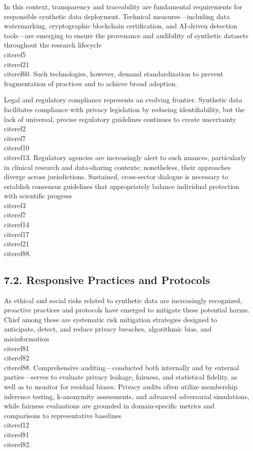\documentclass[11pt]{article}
\begin{document}
In this context, transparency and traceability are fundamental requirements for responsible synthetic data deployment. Technical measures—including data watermarking, cryptographic blockchain certification, and AI-driven detection tools—are emerging to ensure the provenance and audibility of synthetic datasets throughout the research lifecycle \\cite{ref5}\\cite{ref21}\\cite{ref60}. Such technologies, however, demand standardization to prevent fragmentation of practices and to achieve broad adoption.

Legal and regulatory compliance represents an evolving frontier. Synthetic data facilitates compliance with privacy legislation by reducing identifiability, but the lack of universal, precise regulatory guidelines continues to create uncertainty \\cite{ref2}\\cite{ref7}\\cite{ref10}\\cite{ref13}. Regulatory agencies are increasingly alert to such nuances, particularly in clinical research and data-sharing contexts; nonetheless, their approaches diverge across jurisdictions. Sustained, cross-sector dialogue is necessary to establish consensus guidelines that appropriately balance individual protection with scientific progress \\cite{ref3}\\cite{ref7}\\cite{ref14}\\cite{ref17}\\cite{ref21}\\cite{ref88}.

\subsection{7.2. Responsive Practices and Protocols}

As ethical and social risks related to synthetic data are increasingly recognized, proactive practices and protocols have emerged to mitigate these potential harms. Chief among these are systematic risk mitigation strategies designed to anticipate, detect, and reduce privacy breaches, algorithmic bias, and misinformation \\cite{ref81}\\cite{ref82}\\cite{ref88}. Comprehensive auditing—conducted both internally and by external parties—serves to evaluate privacy leakage, fairness, and statistical fidelity, as well as to monitor for residual biases. Privacy audits often utilize membership inference testing, k-anonymity assessments, and advanced adversarial simulations, while fairness evaluations are grounded in domain-specific metrics and comparisons to representative baselines \\cite{ref12}\\cite{ref81}\\cite{ref82}.
\end{document}
